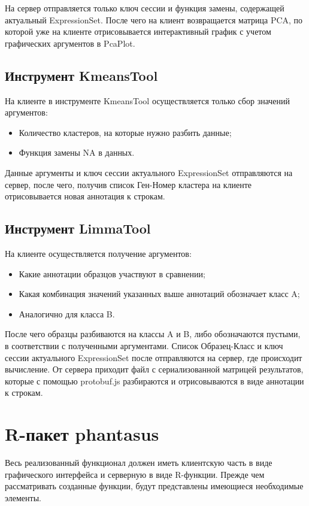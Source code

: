 \documentclass[annotation,specification]{itmo-student-thesis}
\begin{document}
На сервер отправляется только ключ сессии и функция замены, содержащей актуальный ExpressionSet. После чего на клиент возвращается матрица PCA, по которой уже на клиенте отрисовывается интерактивный график с учетом графических аргументов в PcaPlot.

\subsection{Инструмент KmeansTool}
На клиенте в инструменте KmeansTool осуществляется только сбор значений аргументов:
\begin{itemize}
\item Количество кластеров, на которые нужно разбить данные;
\item Функция замены NA в данных.
\end{itemize}

Данные аргументы и ключ сессии актуального ExpressionSet отправляются на сервер, после чего, получив список Ген-Номер кластера на клиенте отрисовывается новая аннотация к строкам.

\subsection{Инструмент LimmaTool}
На клиенте осуществляется получение аргументов:
\begin{itemize}
\item Какие аннотации образцов участвуют в сравнении;
\item Какая комбинация значений указанных выше аннотаций обозначает класс A;
\item Аналогично для класса B.
\end{itemize}

После чего образцы разбиваются на классы A и B, либо обозначаются пустыми, в соответствии с полученными аргументами. Список Образец-Класс и ключ сессии актуального ExpressionSet после отправляются на сервер, где происходит вычисление.
От сервера приходит файл с сериализованной матрицей результатов, которые с помощью protobuf.js разбираются и отрисовываются в виде аннотации к строкам.

\section{R-пакет phantasus}
Весь реализованный функционал должен иметь клиентскую часть в виде графического интерфейса и серверную в виде R-функции.
Прежде чем рассматривать созданные функции, будут представлены имеющиеся необходимые элементы.
\end{document}
